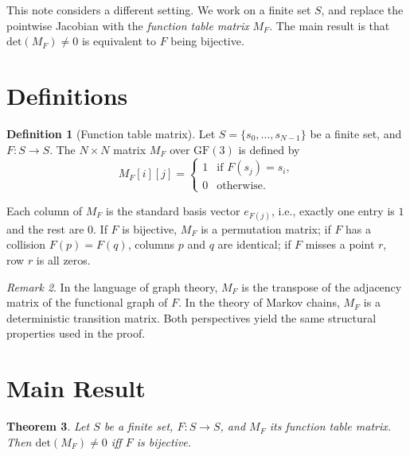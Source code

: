\documentclass[a4paper,11pt]{article}
\newtheorem{theorem}{Theorem}[section]
\theoremstyle{definition}
\newtheorem{definition}[theorem]{Definition}
\theoremstyle{remark}
\newtheorem{remark}[theorem]{Remark}
\newcommand{\GF}{\mathrm{GF}}
\newcommand{\MF}{M_F}
\newcommand{\Det}{\mathrm{det}}
\begin{document}
This note considers a different setting. We work on a finite set $S$,
and replace the pointwise Jacobian with the {\em function table matrix} $\MF$.
The main result is that $\Det(\MF)\neq 0$ is equivalent to $F$ being bijective.

\section{Definitions}

\begin{definition}[Function table matrix]
Let $S=\{s_0,\dots,s_{N-1}\}$ be a finite set, and $F:S\to S$. The $N\times N$
matrix $\MF$ over $\GF(3)$ is defined by
\[
\MF[i][j] = \begin{cases}
1 & \text{if } F(s_j) = s_i,\\
0 & \text{otherwise.}
\end{cases}
\]
\end{definition}

Each column of $\MF$ is the standard basis vector $e_{F(j)}$, i.e.,
exactly one entry is $1$ and the rest are $0$. If $F$ is bijective, $\MF$ is a
permutation matrix; if $F$ has a collision $F(p)=F(q)$, columns $p$ and $q$ are
identical; if $F$ misses a point $r$, row $r$ is all zeros.

\begin{remark}
In the language of graph theory, $\MF$ is the transpose of the adjacency
matrix of the functional graph of $F$. In the theory of Markov chains,
$\MF$ is a deterministic transition matrix. Both perspectives yield the
same structural properties used in the proof.
\end{remark}

\section{Main Result}

\begin{theorem}\label{thm:main}
Let $S$ be a finite set, $F:S\to S$, and $\MF$ its function table matrix.
Then $\Det(\MF)\neq 0$ iff $F$ is bijective.
\end{theorem}
\end{document}
